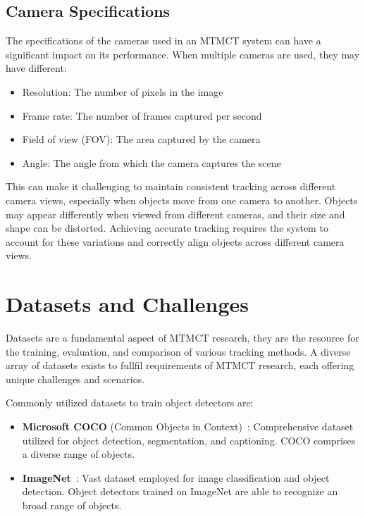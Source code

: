 \subsection{Camera Specifications}\label{subsec:camera_specification}
The specifications of the cameras used in an MTMCT system can have a significant impact on its performance. When multiple cameras are used, they may have different:

\begin{itemize}
    \item Resolution: The number of pixels in the image
    \item Frame rate: The number of frames captured per second
    \item Field of view (FOV): The area captured by the camera
    \item Angle: The angle from which the camera captures the scene
\end{itemize}

This can make it challenging to maintain consistent tracking across different camera views, especially when objects move from one camera to another. Objects may appear differently when viewed from different cameras, and their size and shape can be distorted. Achieving accurate tracking requires the system to account for these variations and correctly align objects across different camera views.

\section{Datasets and Challenges}\label{sec:datasets_and_challenges}
Datasets are a fundamental aspect of MTMCT research, they are the resource for the training, evaluation, and comparison of various tracking methods. A diverse array of datasets exists to fullfil requirements of MTMCT research, each offering unique challenges and scenarios.

Commonly utilized datasets to train object detectors are:

\begin{itemize}
    \item \textbf{Microsoft COCO} (Common Objects in Context)~\cite{Lin14}: Comprehensive dataset utilized for object detection, segmentation, and captioning. COCO comprises a diverse range of objects.
    \item \textbf{ImageNet}~\cite{Deng09}: Vast dataset employed for image classification and object detection. Object detectors trained on ImageNet are able to recognize an broad range of objects.
\end{itemize}

